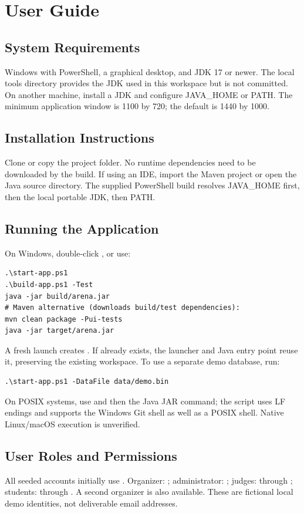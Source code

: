 \documentclass[12pt]{article}
\begin{document}
\clearpage\appendix
\section{User Guide}
\subsection{System Requirements}
Windows with PowerShell, a graphical desktop, and JDK 17 or newer. The local tools directory provides the JDK used in this workspace but is not committed. On another machine, install a JDK and configure JAVA\_HOME or PATH. The minimum application window is 1100 by 720; the default is 1440 by 1000.
\subsection{Installation Instructions}
Clone or copy the project folder. No runtime dependencies need to be downloaded by the build. If using an IDE, import the Maven project or open the Java source directory. The supplied PowerShell build resolves JAVA\_HOME first, then the local portable JDK, then PATH.
\subsection{Running the Application}
On Windows, double-click , or use:
\begin{verbatim}
.\start-app.ps1
.\build-app.ps1 -Test
java -jar build/arena.jar
# Maven alternative (downloads build/test dependencies):
mvn clean package -Pui-tests
java -jar target/arena.jar
\end{verbatim}
A fresh launch creates . If  already exists, the launcher and Java entry point reuse it, preserving the existing workspace. To use a separate demo database, run:
\begin{verbatim}
.\start-app.ps1 -DataFile data/demo.bin
\end{verbatim}
On POSIX systems, use  and then the Java JAR command; the script uses LF endings and supports the Windows Git shell as well as a POSIX shell. Native Linux/macOS execution is unverified.
\subsection{User Roles and Permissions}
All seeded accounts initially use . Organizer: ; administrator: ; judges:  through ; students:  through . A second organizer is also available. These are fictional local demo identities, not deliverable email addresses.
\end{document}
